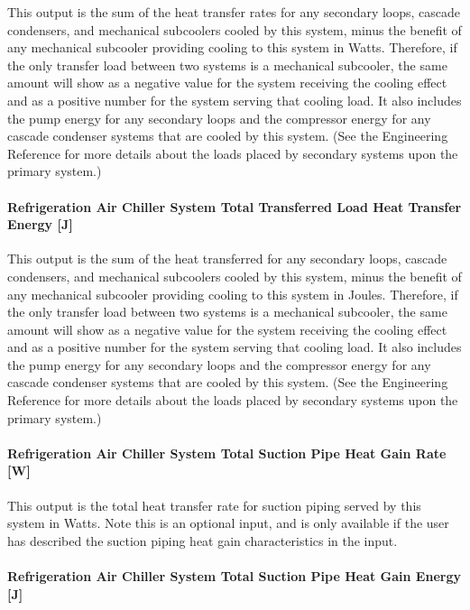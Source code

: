 This output is the sum of the heat transfer rates for any secondary loops, cascade condensers, and mechanical subcoolers cooled by this system, minus the benefit of any mechanical subcooler providing cooling to this system in Watts. Therefore, if the only transfer load between two systems is a mechanical subcooler, the same amount will show as a negative value for the system receiving the cooling effect and as a positive number for the system serving that cooling load. It also includes the pump energy for any secondary loops and the compressor energy for any cascade condenser systems that are cooled by this system. (See the Engineering Reference for more details about the loads placed by secondary systems upon the primary system.)

\paragraph{Refrigeration Air Chiller System Total Transferred Load Heat Transfer Energy {[}J{]}}\label{refrigeration-air-chiller-system-total-transferred-load-heat-transfer-energy-j}

This output is the sum of the heat transferred for any secondary loops, cascade condensers, and mechanical subcoolers cooled by this system, minus the benefit of any mechanical subcooler providing cooling to this system in Joules. Therefore, if the only transfer load between two systems is a mechanical subcooler, the same amount will show as a negative value for the system receiving the cooling effect and as a positive number for the system serving that cooling load. It also includes the pump energy for any secondary loops and the compressor energy for any cascade condenser systems that are cooled by this system. (See the Engineering Reference for more details about the loads placed by secondary systems upon the primary system.)

\paragraph{Refrigeration Air Chiller System Total Suction Pipe Heat Gain Rate {[}W{]}}\label{refrigeration-air-chiller-system-total-suction-pipe-heat-gain-rate-w}

This output is the total heat transfer rate for suction piping served by this system in Watts. Note this is an optional input, and is only available if the user has described the suction piping heat gain characteristics in the input.

\paragraph{Refrigeration Air Chiller System Total Suction Pipe Heat Gain Energy {[}J{]}}\label{refrigeration-air-chiller-system-total-suction-pipe-heat-gain-energy-j}

